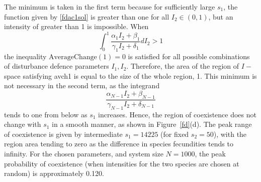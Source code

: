 The minimum is taken in the first term because for sufficiently large $s_1$, the function given by \eqref{fdac1sol} is greater than one for all $I_2 \in (0,1)$, but an intensity of greater than 1 is impossible. When
\begin{equation}
\label{fdto:lbint}
\int_0^1  \frac{\alpha_1 I_2 +\beta_1}{\gamma_1 I_2+\delta_1} dI_2 >1
\end{equation}
the inequality $\text{AverageChange}(1)=0$ is satisfied for all possible combinations of disturbance defence parameters $I_1,I_2$. Therefore, the area of the region of $I-$space satisfying {avch1} is equal to the size of the whole region, 1. This minimum is not necessary in the second term, as the integrand
$$
\frac{\alpha_{N-1} I_2 +\beta_{N-1}}{\gamma_{N-1} I_2+\delta_{N-1}}
$$
tends to one from below as $s_1$ increases.
 Hence, the region of coexistence does not change with $s_1$ in a smooth manner, as shown in Figure~\ref{fd}(d). The peak range of coexistence is given by intermediate $s_1=14225$ (for fixed $s_2=50$), with the region area tending to zero as the difference in species fecundities tends to infinity. For the chosen parameters, and system size $N=1000$, the peak probability of coexistence (when intensities for the two species are chosen at random) is approximately 0.120.
